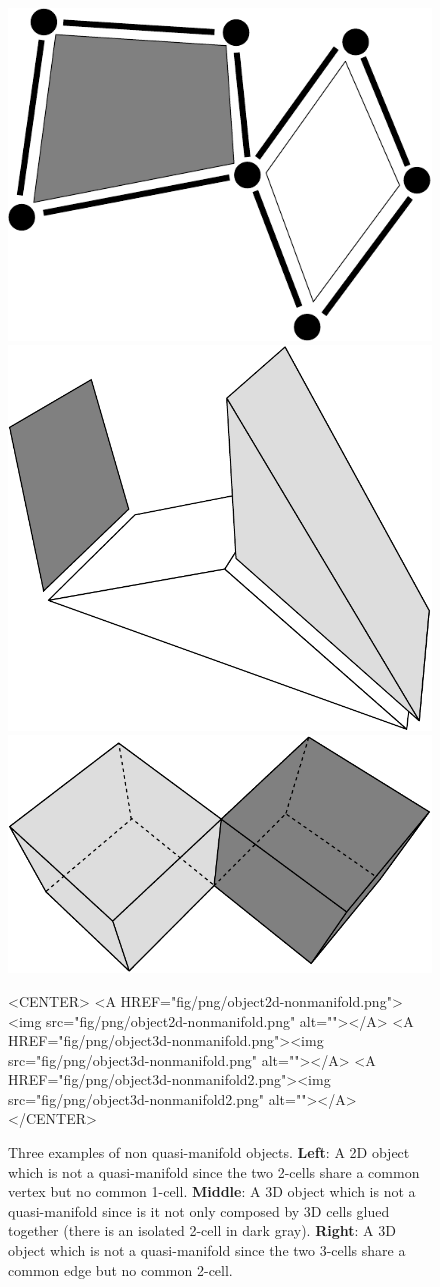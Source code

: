\begin{figure}[ht]
  \begin{ccTexOnly}
    \begin{center}
      \includegraphics[width=.22\textwidth]
      {Combinatorial_map/fig/pdf/object2d-nonmanifold}
      \qquad
      \includegraphics[width=.3\textwidth]
      {Combinatorial_map/fig/pdf/object3d-nonmanifold}
      \qquad
      \includegraphics[width=.35\textwidth]
      {Combinatorial_map/fig/pdf/object3d-nonmanifold2}
    \end{center}
  \end{ccTexOnly}
  \begin{ccHtmlOnly}
    <CENTER>
    <A HREF="fig/png/object2d-nonmanifold.png"><img src="fig/png/object2d-nonmanifold.png" alt=""></A>
    <A HREF="fig/png/object3d-nonmanifold.png"><img src="fig/png/object3d-nonmanifold.png" alt=""></A>
    <A HREF="fig/png/object3d-nonmanifold2.png"><img src="fig/png/object3d-nonmanifold2.png" alt=""></A>
    </CENTER>
    \end{ccHtmlOnly}
    \caption{Three examples of non quasi-manifold
      objects. \textbf{Left}: A 2D object which is not a
      quasi-manifold since the two 2-cells share a common vertex but
      no common 1-cell.  \textbf{Middle}: A 3D object which is not a
      quasi-manifold since is it not only composed by 3D cells glued
      together (there is an isolated 2-cell in dark
      gray). \textbf{Right}: A 3D object which is not a quasi-manifold
      since the two 3-cells share a common edge but no common 2-cell.
    }
    \label{fig-nonquasi-manifold}
\end{figure}

